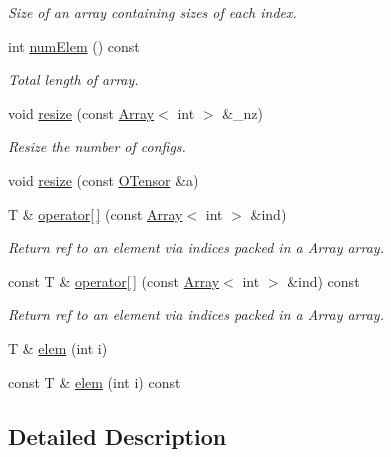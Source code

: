 \begin{DoxyCompactItemize}
\begin{DoxyCompactList}\small\item\em Size of an array containing sizes of each index. \end{DoxyCompactList}\item 
int \mbox{\hyperlink{classENSEM_1_1OTensor_a30a241a5b4f16fab55fd70ffee52828a}{num\+Elem}} () const
\begin{DoxyCompactList}\small\item\em Total length of array. \end{DoxyCompactList}\item 
void \mbox{\hyperlink{classENSEM_1_1OTensor_abe0bd734d08b1140d7794ec760a89435}{resize}} (const \mbox{\hyperlink{classXMLArray_1_1Array}{Array}}$<$ int $>$ \&\+\_\+nz)
\begin{DoxyCompactList}\small\item\em Resize the number of configs. \end{DoxyCompactList}\item 
void \mbox{\hyperlink{classENSEM_1_1OTensor_aee9b85f3726c01139b9194a3b95809d3}{resize}} (const \mbox{\hyperlink{classENSEM_1_1OTensor}{O\+Tensor}} \&a)
\item 
T \& \mbox{\hyperlink{classENSEM_1_1OTensor_adbfded2bb2af9d68e0a040df0d19b2d6}{operator\mbox{[}$\,$\mbox{]}}} (const \mbox{\hyperlink{classXMLArray_1_1Array}{Array}}$<$ int $>$ \&ind)
\begin{DoxyCompactList}\small\item\em Return ref to an element via indices packed in a Array array. \end{DoxyCompactList}\item 
const T \& \mbox{\hyperlink{classENSEM_1_1OTensor_aa649ae52fc364d173eb02db2fbee8172}{operator\mbox{[}$\,$\mbox{]}}} (const \mbox{\hyperlink{classXMLArray_1_1Array}{Array}}$<$ int $>$ \&ind) const
\begin{DoxyCompactList}\small\item\em Return ref to an element via indices packed in a Array array. \end{DoxyCompactList}\item 
T \& \mbox{\hyperlink{classENSEM_1_1OTensor_a18a4095f1e99228c27768fbea8eec05d}{elem}} (int i)
\item 
const T \& \mbox{\hyperlink{classENSEM_1_1OTensor_a788f146a247856d6b391cfd8f903657b}{elem}} (int i) const
\end{DoxyCompactItemize}


\subsection{Detailed Description}
